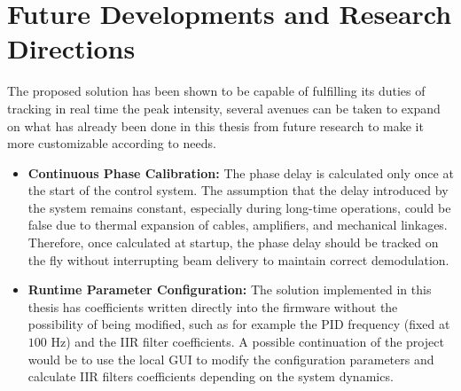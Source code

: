 \section{Future Developments and Research Directions}
The proposed solution has been shown to be capable of fulfilling its duties of tracking in real time the peak intensity, several avenues can be taken to expand on what has already been done in this thesis from future research to make it more customizable according to needs.

\begin{itemize}

    \item \textbf{Continuous Phase Calibration:}
    The phase delay is calculated only once at the start of the control system.
    The assumption that the delay introduced by the system remains constant, especially during long-time operations, could be false due to thermal expansion of cables, amplifiers, and mechanical linkages. Therefore, once calculated at startup, the phase delay should be tracked on the fly without interrupting beam delivery to maintain correct demodulation.

    \item \textbf{Runtime Parameter Configuration:}
    The solution implemented in this thesis has coefficients written directly into the firmware without the possibility of being modified, such as for example the PID frequency (fixed at $100\text{ Hz}$) and the IIR filter coefficients.
    A possible continuation of the project would be to use the local GUI to modify the configuration parameters and calculate IIR filters coefficients depending on the system dynamics.
\end{itemize}